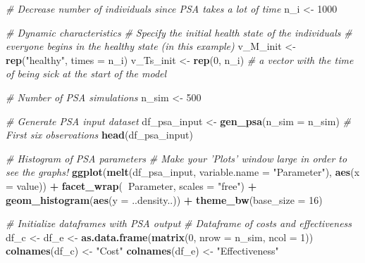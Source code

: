 \documentclass[
]{article}
\newenvironment{Shaded}{\begin{snugshade}}{\end{snugshade}}
\newcommand{\CommentTok}[1]{\textcolor[rgb]{0.56,0.35,0.01}{\textit{#1}}}
\newcommand{\DataTypeTok}[1]{\textcolor[rgb]{0.13,0.29,0.53}{#1}}
\newcommand{\DecValTok}[1]{\textcolor[rgb]{0.00,0.00,0.81}{#1}}
\newcommand{\KeywordTok}[1]{\textcolor[rgb]{0.13,0.29,0.53}{\textbf{#1}}}
\newcommand{\NormalTok}[1]{#1}
\newcommand{\OperatorTok}[1]{\textcolor[rgb]{0.81,0.36,0.00}{\textbf{#1}}}
\newcommand{\StringTok}[1]{\textcolor[rgb]{0.31,0.60,0.02}{#1}}
\begin{document}
\begin{Shaded}
\begin{Highlighting}[]
\CommentTok{# Decrease number of individuals since PSA takes a lot of time}
\NormalTok{n_i <-}\StringTok{ }\DecValTok{1000}

\CommentTok{# Dynamic characteristics }
\CommentTok{# Specify the initial health state of the individuals }
\CommentTok{# everyone begins in the healthy state (in this example)}
\NormalTok{v_M_init <-}\StringTok{ }\KeywordTok{rep}\NormalTok{(}\StringTok{"healthy"}\NormalTok{, }\DataTypeTok{times =}\NormalTok{ n_i)  }
\NormalTok{v_Ts_init <-}\StringTok{ }\KeywordTok{rep}\NormalTok{(}\DecValTok{0}\NormalTok{, n_i) }\CommentTok{# a vector with the time of being sick at the start of the model }

\CommentTok{# Number of PSA simulations}
\NormalTok{n_sim <-}\StringTok{ }\DecValTok{500}

\CommentTok{# Generate PSA input dataset}
\NormalTok{df_psa_input <-}\StringTok{ }\KeywordTok{gen_psa}\NormalTok{(}\DataTypeTok{n_sim =}\NormalTok{ n_sim)}
\CommentTok{# First six observations}
\KeywordTok{head}\NormalTok{(df_psa_input)}

\CommentTok{# Histogram of PSA parameters}
\CommentTok{# Make your 'Plots' window large in order to see the graphs! }
\KeywordTok{ggplot}\NormalTok{(}\KeywordTok{melt}\NormalTok{(df_psa_input, }\DataTypeTok{variable.name =} \StringTok{"Parameter"}\NormalTok{), }\KeywordTok{aes}\NormalTok{(}\DataTypeTok{x =}\NormalTok{ value)) }\OperatorTok{+}
\StringTok{  }\KeywordTok{facet_wrap}\NormalTok{(}\OperatorTok{~}\NormalTok{Parameter, }\DataTypeTok{scales =} \StringTok{"free"}\NormalTok{) }\OperatorTok{+}
\StringTok{  }\KeywordTok{geom_histogram}\NormalTok{(}\KeywordTok{aes}\NormalTok{(}\DataTypeTok{y =}\NormalTok{ ..density..)) }\OperatorTok{+}
\StringTok{  }\KeywordTok{theme_bw}\NormalTok{(}\DataTypeTok{base_size =} \DecValTok{16}\NormalTok{)}

\CommentTok{# Initialize dataframes with PSA output }
\CommentTok{# Dataframe of costs and effectiveness }
\NormalTok{df_c <-}\StringTok{ }\NormalTok{df_e <-}\StringTok{ }\KeywordTok{as.data.frame}\NormalTok{(}\KeywordTok{matrix}\NormalTok{(}\DecValTok{0}\NormalTok{, }
                             \DataTypeTok{nrow =}\NormalTok{ n_sim,}
                             \DataTypeTok{ncol =} \DecValTok{1}\NormalTok{))}
\KeywordTok{colnames}\NormalTok{(df_c) <-}\StringTok{ "Cost"}
\KeywordTok{colnames}\NormalTok{(df_e) <-}\StringTok{ "Effectiveness"}
\end{Highlighting}
\end{Shaded}
\end{document}
